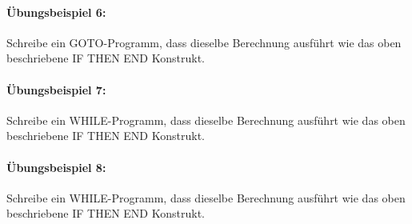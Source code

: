 \documentclass[11pt,a4paper,leqno]{report}
\numberwithin{equation}{chapter}
\begin{document}
\paragraph{Übungsbeispiel 6:} Schreibe ein GOTO-Programm, dass dieselbe Berechnung ausführt wie das oben beschriebene IF THEN END Konstrukt.

\paragraph{Übungsbeispiel 7:} Schreibe ein WHILE-Programm, dass dieselbe Berechnung ausführt wie das oben beschriebene IF THEN END Konstrukt.

\paragraph{Übungsbeispiel 8:} Schreibe ein WHILE-Programm, dass dieselbe Berechnung ausführt wie das oben beschriebene IF THEN END Konstrukt.
\end{document}
